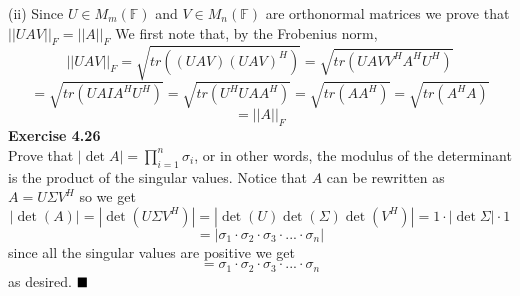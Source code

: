 \documentclass[letterpaper,12pt]{article}
\theoremstyle{definition}
\begin{document}
(ii) Since $U \in M_{m}(\mathbb{F})$ and $V \in M_{n}(\mathbb{F})$ are orthonormal matrices we prove that $||UAV||_{F}=||A||_{F}$
We first note that, by the Frobenius norm,\\
\[||UAV||_{F}=\sqrt{tr((UAV)(UAV)^H)}=\sqrt{tr(UAVV^HA^HU^H)}\]
\[=\sqrt{tr(UAIA^HU^H)}=\sqrt{tr(U^HUAA^H)}=\sqrt{tr(AA^H)}=\sqrt{tr(A^HA)}\]
\[=||A||_{F}\]
\textbf{Exercise 4.26}\\
Prove that $| \det A|=\prod_{i=1}^n \sigma_i$, or in other words, the modulus of the determinant is the product of the singular values.
Notice that $A$ can be rewritten as $A=U\Sigma V^H$ so we get
\[|\det (A)|= |\det (U\Sigma V^H)|=|\det (U) \det (\Sigma) \det (V^H)|=1\cdot |\det \Sigma |\cdot 1\]
\[= |\sigma_1 \cdot \sigma_2 \cdot \sigma_3 \cdot ...\cdot \sigma _n|\]
since all the singular values are positive we get
\[= \sigma_1 \cdot \sigma_2 \cdot \sigma_3 \cdot ...\cdot \sigma _n\]
as desired. 
$\hfill \blacksquare$\\
\end{document}
